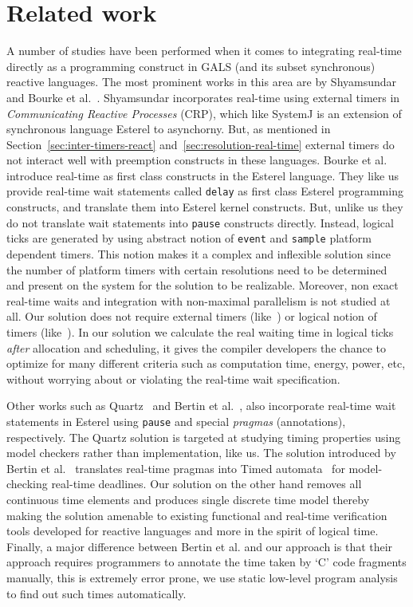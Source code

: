 \section{Related work}
\label{sec:related-work}


A number of studies have been performed when it comes to integrating
real-time directly as a programming construct in GALS (and its subset
synchronous) reactive languages. The most prominent works in this area
are by Shyamsundar~\cite{rsh94} and Bourke et
al.~\cite{Bourke2009a}. Shyamsundar incorporates real-time using
external timers in \textit{Communicating Reactive Processes} (CRP),
which like SystemJ is an extension of synchronous language Esterel to
asynchorny. But, as mentioned in Section~\ref{sec:inter-timers-react}
and~\ref{sec:resolution-real-time} external timers do not interact well
with preemption constructs in these languages. Bourke et al. introduce
real-time as first class constructs in the Esterel language. They like
us provide real-time wait statements called \texttt{delay} as first
class Esterel programming constructs, and translate them into Esterel
kernel constructs. But, unlike us they do not translate wait statements
into \texttt{pause} constructs directly. Instead, logical ticks are
generated by using abstract notion of \texttt{event} and \texttt{sample}
platform dependent timers. This notion makes it a complex and inflexible
solution since the number of platform timers with certain resolutions
need to be determined and present on the system for the solution to be
realizable. Moreover, non exact real-time waits and integration with
non-maximal parallelism is not studied at all. Our solution does not
require external timers (like~\cite{rsh94}) or logical notion of timers
(like~\cite{Bourke2009a}). In our solution we calculate the real waiting
time in logical ticks \textit{after} allocation and scheduling, it gives
the compiler developers the chance to optimize for many different
criteria such as computation time, energy, power, etc, without worrying
about or violating the real-time wait specification.

Other works such as Quartz~\cite{glog02} and Bertin et
al.~\cite{Bertin:2000:TVR:1947412.1947439}, also incorporate real-time
wait statements in Esterel using \texttt{pause} and special
\textit{pragmas} (annotations), respectively.  The Quartz solution is
targeted at studying timing properties using model checkers rather than
implementation, like us. The solution introduced by Bertin et
al.~\cite{Bertin:2000:TVR:1947412.1947439} translates real-time pragmas
into Timed automata~\cite{alur94} for model-checking real-time
deadlines. Our solution on the other hand removes all continuous time
elements and produces single discrete time model thereby making the
solution amenable to existing functional and real-time verification
tools developed for reactive languages and more in the spirit of logical
time. Finally, a major difference between Bertin et al. and our approach
is that their approach requires programmers to annotate the time taken
by `C' code fragments manually, this is extremely error prone, we use
static low-level program analysis to find out such times automatically.




